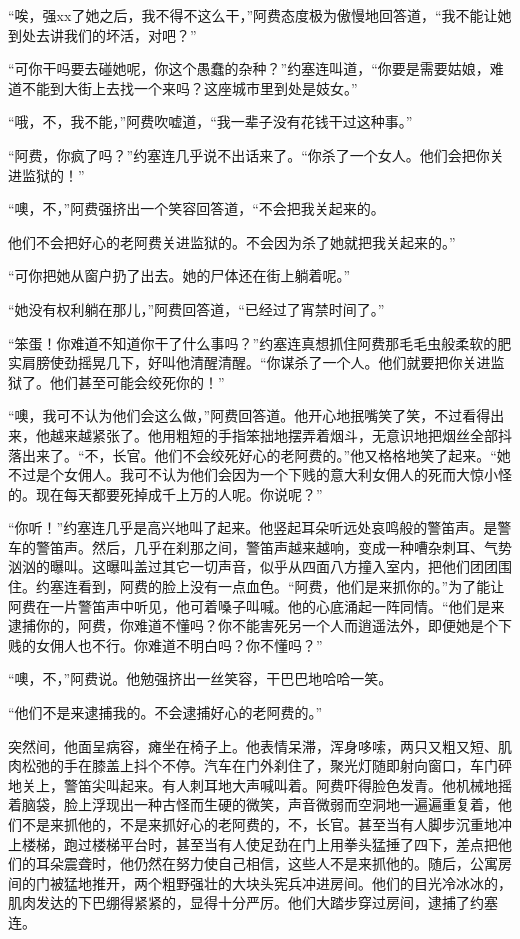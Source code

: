     “唉，强xx了她之后，我不得不这么干，”阿费态度极为傲慢地回答道，“我不能让她到处去讲我们的坏活，对吧？”

    “可你干吗要去碰她呢，你这个愚蠢的杂种？”约塞连叫道，“你要是需要姑娘，难道不能到大街上去找一个来吗？这座城市里到处是妓女。”

    “哦，不，我不能，”阿费吹嘘道，“我一辈子没有花钱干过这种事。”

    “阿费，你疯了吗？”约塞连几乎说不出话来了。“你杀了一个女人。他们会把你关进监狱的！”

    “噢，不，”阿费强挤出一个笑容回答道，“不会把我关起来的。

    他们不会把好心的老阿费关进监狱的。不会因为杀了她就把我关起来的。”

    “可你把她从窗户扔了出去。她的尸体还在街上躺着呢。”

    “她没有权利躺在那儿，”阿费回答道，“已经过了宵禁时间了。”

    “笨蛋！你难道不知道你干了什么事吗？”约塞连真想抓住阿费那毛毛虫般柔软的肥实肩膀使劲摇晃几下，好叫他清醒清醒。“你谋杀了一个人。他们就要把你关进监狱了。他们甚至可能会绞死你的！”

    “噢，我可不认为他们会这么做，”阿费回答道。他开心地抿嘴笑了笑，不过看得出来，他越来越紧张了。他用粗短的手指笨拙地摆弄着烟斗，无意识地把烟丝全部抖落出来了。“不，长官。他们不会绞死好心的老阿费的。”他又格格地笑了起来。“她不过是个女佣人。我可不认为他们会因为一个下贱的意大利女佣人的死而大惊小怪的。现在每天都要死掉成千上万的人呢。你说呢？”

    “你听！”约塞连几乎是高兴地叫了起来。他竖起耳朵听远处哀鸣般的警笛声。是警车的警笛声。然后，几乎在刹那之间，警笛声越来越响，变成一种嘈杂刺耳、气势汹汹的曝叫。这曝叫盖过其它一切声音，似乎从四面八方撞入室内，把他们团团围住。约塞连看到，阿费的脸上没有一点血色。“阿费，他们是来抓你的。”为了能让阿费在一片警笛声中听见，他可着嗓子叫喊。他的心底涌起一阵同情。“他们是来逮捕你的，阿费，你难道不懂吗？你不能害死另一个人而逍遥法外，即便她是个下贱的女佣人也不行。你难道不明白吗？你不懂吗？”

    “噢，不，”阿费说。他勉强挤出一丝笑容，干巴巴地哈哈一笑。

    “他们不是来逮捕我的。不会逮捕好心的老阿费的。”

    突然间，他面呈病容，瘫坐在椅子上。他表情呆滞，浑身哆嗦，两只又粗又短、肌肉松弛的手在膝盖上抖个不停。汽车在门外刹住了，聚光灯随即射向窗口，车门砰地关上，警笛尖叫起来。有人刺耳地大声喊叫着。阿费吓得脸色发青。他机械地摇着脑袋，脸上浮现出一种古怪而生硬的微笑，声音微弱而空洞地一遍遍重复着，他们不是来抓他的，不是来抓好心的老阿费的，不，长官。甚至当有人脚步沉重地冲上楼梯，跑过楼梯平台时，甚至当有人使足劲在门上用拳头猛捶了四下，差点把他们的耳朵震聋时，他仍然在努力使自己相信，这些人不是来抓他的。随后，公寓房间的门被猛地推开，两个粗野强壮的大块头宪兵冲进房间。他们的目光冷冰冰的，肌肉发达的下巴绷得紧紧的，显得十分严厉。他们大踏步穿过房间，逮捕了约塞连。

